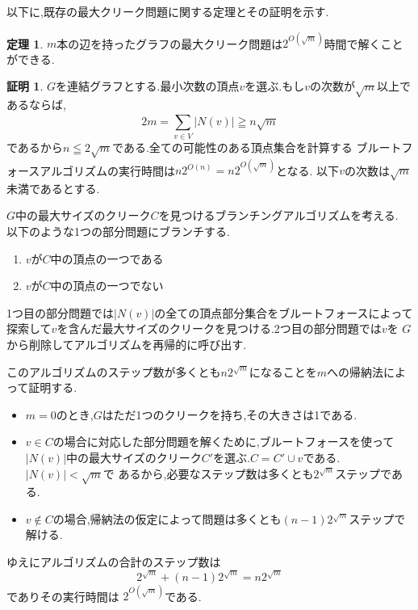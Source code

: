 \documentclass{thesis}
\theoremstyle{definition}
\newtheorem{theorem}{定理}[chapter]
\newtheorem*{prf*}{証明}
\begin{document}
以下に,既存の最大クリーク問題に関する定理とその証明を示す. \cite{fomin2010exact}
\begin{theorem} \label{theorem:1}
$m$本の辺を持ったグラフの最大クリーク問題は$2^{O(\sqrt{m})}$時間で解くことができる.
\begin{prf*}
$G$を連結グラフとする.最小次数の頂点$v$を選ぶ.もし$v$の次数が$\sqrt{m}$以上であるならば,
\[ 2m = \sum_{v \in V}^{} |N(v)| \geqq n\sqrt{m} \]
であるから$n \leqq 2\sqrt{m}$である.全ての可能性のある頂点集合を計算する
ブルートフォースアルゴリズムの実行時間は$n2^{O(n)} = n2^{O(\sqrt{m})}$となる.
以下$v$の次数は$\sqrt{m}$未満であるとする.

$G$中の最大サイズのクリーク$C$を見つけるブランチングアルゴリズムを考える.
以下のような1つの部分問題にブランチする.
\begin{enumerate}
 \item $v$が$C$中の頂点の一つである
 \item $v$が$C$中の頂点の一つでない
\end{enumerate}
1つ目の部分問題では$|N(v)|$の全ての頂点部分集合をブルートフォースによって
探索して$v$を含んだ最大サイズのクリークを見つける.2つ目の部分問題では$v$を
$G$から削除してアルゴリズムを再帰的に呼び出す.

このアルゴリズムのステップ数が多くとも$n2^{\sqrt{m}}$になることを$m$への帰納法によって証明する.
\begin{itemize}
 \item $m = 0$のとき,$G$はただ1つのクリークを持ち,その大きさは1である.	
 \item $v \in C$の場合に対応した部分問題を解くために,ブルートフォースを使って
$|N(v)|$中の最大サイズのクリーク$C'$を選ぶ.$C = C'  \cup  v$である.$|N(v)| < \sqrt{m}$で
あるから,必要なステップ数は多くとも$2^{\sqrt{m}}$ステップである.
 \item $v \notin C$の場合,帰納法の仮定によって問題は多くとも$(n - 1)2^{\sqrt{m}}$ステップで解ける.
\end{itemize}
ゆえにアルゴリズムの合計のステップ数は
\[  2^{\sqrt{m}} +  (n - 1)2^{\sqrt{m}} = n2^{\sqrt{m}} \]
でありその実行時間は $2^{O(\sqrt{m})}$である. 
\end{prf*}
\end{theorem}
\end{document}
